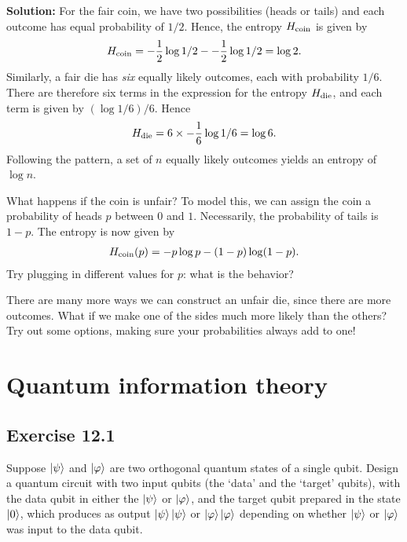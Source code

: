 \documentclass{book}
\begin{document}
    \textbf{Solution:} For the fair coin, we have two possibilities (heads or tails) and each outcome has equal probability of $1/2$. Hence, the entropy $H_{\rm{coin}}$ is given by
    \begin{align}
        H_{\rm{coin}} = -\frac{1}{2}\log1/2--\frac{1}{2}\log1/2 = \log 2.
    \end{align}
    Similarly, a fair die has \emph{six} equally likely outcomes, each with probability $1/6$. There are therefore six terms in the expression for the entropy $H_{\rm{die}}$, and each term is given by $(\log 1/6)/6$. Hence
    \begin{align}
        H_{\rm{die}} = 6 \times -\frac{1}{6}\log 1/6 = \log 6.
    \end{align}
    Following the pattern, a set of $n$ equally likely outcomes yields an entropy of $\log n$. 
    
    What happens if the coin is unfair? To model this, we can assign the coin a probability of heads $p$ between $0$ and $1$. Necessarily, the probability of tails is $1-p$. The entropy is now given by
    \begin{align}
        H_{\rm{coin}} (p) = -p\log p - (1-p) \log (1-p).
    \end{align}
    Try plugging in different values for $p$: what is the behavior? 
    
    There are many more ways we can construct an unfair die, since there are more outcomes. What if we make one of the sides much more likely than the others? Try out some options, making sure your probabilities always add to one!

\chapter{Quantum information theory}

\section*{Exercise 12.1}
    Suppose $\ket{\psi}$ and $\ket{\varphi}$ are two orthogonal quantum states of a single qubit. Design a quantum circuit with two input qubits (the ‘data’ and the ‘target’ qubits), with the data qubit in either the  $\ket{\psi}$ or $\ket{\varphi}$, and the target qubit prepared in the state $\ket{0}$, which produces as output $\ket{\psi}\ket{\psi}$ or $\ket{\varphi}\ket{\varphi}$ depending on whether $\ket{\psi}$ or $\ket{\varphi}$ was input to the data qubit. 
    
\end{document}
